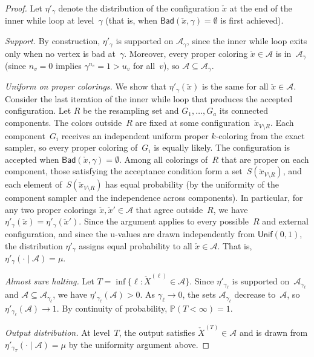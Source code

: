 \documentclass[10pt,a4paper]{amsart}
\renewcommand{\v}[1]{\check{#1}}
\newcommand{\bad}{\mathsf{Bad}}
\newcommand{\mX}{\v{X}}
\newcommand{\mc}{\mathcal}
\newcommand{\mx}{\v{x}}
\newcommand{\pp}{\mathbb{P}}
\newcommand{\unif}{\mathsf{Unif}}
\theoremstyle{plain}
\theoremstyle{definition}
\theoremstyle{remark}
\begin{document}
\begin{proof}
Let \(\eta'_{\gamma}\) denote the distribution of the configuration \(\mx\) at the end of the inner while loop at level~\(\gamma\) (that is, when \(\bad(\mx,\gamma)=\emptyset\) is first achieved).

{\em Support.}
By construction, \(\eta'_\gamma\) is supported on \(\mc A_\gamma\), since the inner while loop exits only when no vertex is bad at~\(\gamma\). Moreover, every proper coloring \(\mx\in\mc A\) is in~\(\mc A_\gamma\) (since \(n_v=0\) implies \(\gamma^{n_v}=1>u_v\) for all~\(v\)), so \(\mc A\subseteq\mc A_\gamma\).

{\em Uniform on proper colorings.}
We show that \(\eta'_\gamma(\mx)\) is the same for all \(\mx\in\mc A\). Consider the last iteration of the inner while loop that produces the accepted configuration. Let \(R\) be the resampling set and \(G_1,\ldots,G_a\) its connected components. The colors outside~\(R\) are fixed at some configuration~\(\mx_{V\setminus R}\). Each component~\(G_i\) receives an independent uniform proper \(k\)-coloring from the exact sampler, so every proper coloring of~\(G_i\) is equally likely. The configuration is accepted when \(\bad(\mx,\gamma)=\emptyset\). Among all colorings of~\(R\) that are proper on each component, those satisfying the acceptance condition form a set~\(S(\mx_{V\setminus R})\), and each element of~\(S(\mx_{V\setminus R})\) has equal probability (by the uniformity of the component sampler and the independence across components). In particular, for any two proper colorings \(\mx,\mx'\in\mc A\) that agree outside~\(R\), we have \(\eta'_\gamma(\mx)=\eta'_\gamma(\mx')\). Since the argument applies to every possible~\(R\) and external configuration, and since the u-values are drawn independently from \(\unif(0,1)\), the distribution \(\eta'_\gamma\) assigns equal probability to all \(\mx\in\mc A\). That is, \(\eta'_\gamma(\cdot\mid\mc A) = \mu\).

{\em Almost sure halting.}
Let \(T=\inf\{\ell:\mX^{(\ell)}\in\mc A\}\). Since \(\eta'_{\gamma_\ell}\) is supported on~\(\mc A_{\gamma_\ell}\) and \(\mc A\subseteq\mc A_{\gamma_\ell}\), we have \(\eta'_{\gamma_\ell}(\mc A)>0\). As \(\gamma_\ell\to0\), the sets \(\mc A_{\gamma_\ell}\) decrease to~\(\mc A\), so \(\eta'_{\gamma_\ell}(\mc A)\to1\). By continuity of probability, \(\pp(T<\infty)=1\).

{\em Output distribution.}
At level~\(T\), the output satisfies \(\mX^{(T)}\in\mc A\) and is drawn from \(\eta'_{\gamma_T}(\cdot\mid\mc A)=\mu\) by the uniformity argument above.
\end{proof}
\end{document}
